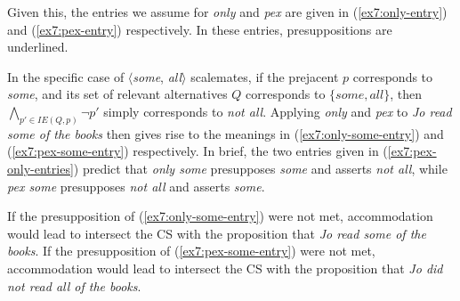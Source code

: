 Given this, the entries we assume for \textit{only} and \textit{pex} are given in (\ref{ex7:only-entry}) and (\ref{ex7:pex-entry}) respectively. In these entries, presuppositions are underlined.

\begin{exe}
	\ex \label{ex7:pex-only-entries}
	\begin{xlist}
		\label{ex7:only-entry}
		\label{ex7:pex-entry}
	\end{xlist}
\end{exe}

In the specific case of $\langle$\textit{some}, \textit{all}$\rangle$ scalemates, if the prejacent $p$ corresponds to \textit{some}, and its set of relevant alternatives $Q$ corresponds to $\lbrace \textit{some}, \textit{all} \rbrace$, then $\bigwedge_{p' \in IE(Q, p)} \neg p'$ simply corresponds to \textit{not all}. Applying \textit{only} and \textit{pex} to \textit{Jo read some of the books} then gives rise to the meanings in (\ref{ex7:only-some-entry}) and (\ref{ex7:pex-some-entry}) respectively. In brief, the two entries given in (\ref{ex7:pex-only-entries}) predict that \textit{only some} presupposes \textit{some} and asserts \textit{not all}, while \textit{pex some} presupposes \textit{not all} and asserts \textit{some}.
\begin{exe}
	\ex \label{ex7:pex-only-some}
	\begin{xlist}
		\label{ex7:only-some-entry}
		\label{ex7:pex-some-entry}
	\end{xlist}
\end{exe}

If the presupposition of (\ref{ex7:only-some-entry}) were not met, accommodation would lead to intersect the CS with the proposition that \textit{Jo read some of the books}. If the presupposition of (\ref{ex7:pex-some-entry}) were not met, accommodation would lead to intersect the CS with the proposition that \textit{Jo did not read all of the books}.\\


